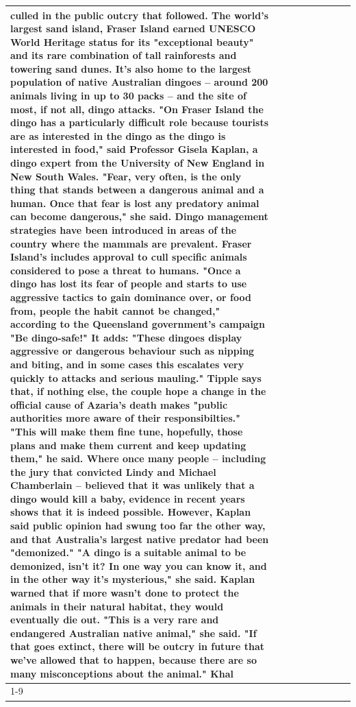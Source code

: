 \begin{table}[H]
\begin{tabular}{lllrlllll}
culled in the public outcry that followed. The world's largest sand island, Fraser Island earned UNESCO World Heritage status for its "exceptional beauty" and its rare combination of tall rainforests and towering sand dunes. It's also home to the largest population of native Australian dingoes -- around 200 animals living in up to 30 packs -- and the site of most, if not all, dingo attacks. "On Fraser Island the dingo has a particularly difficult role because tourists are as interested in the dingo as the dingo is interested in food," said Professor Gisela Kaplan, a dingo expert from the University of New England in New South Wales. "Fear, very often, is the only thing that stands between a dangerous animal and a human. Once that fear is lost any predatory animal can become dangerous," she said. Dingo management strategies have been introduced in areas of the country where the mammals are prevalent. Fraser Island's includes approval to cull specific animals considered to pose a threat to humans. "Once a dingo has lost its fear of people and starts to use aggressive tactics to gain dominance over, or food from, people the habit cannot be changed," according to the Queensland government's campaign "Be dingo-safe!" It adds: "These dingoes display aggressive or dangerous behaviour such as nipping and biting, and in some cases this escalates very quickly to attacks and serious mauling." Tipple says that, if nothing else, the couple hope a change in the official cause of Azaria's death makes "public authorities more aware of their responsibilties." "This will make them fine tune, hopefully, those plans and make them current and keep updating them," he said. Where once many people -- including the jury that convicted Lindy and Michael Chamberlain -- believed that it was unlikely that a dingo would kill a baby, evidence in recent years shows that it is indeed possible. However, Kaplan said public opinion had swung too far the other way, and that Australia's largest native predator had been "demonized." "A dingo is a suitable animal to be demonized, isn't it? In one way you can know it, and in the other way it's mysterious," she said. Kaplan warned that if more wasn't done to protect the animals in their natural habitat, they would eventually die out. "This is a very rare and endangered Australian native animal," she said. "If that goes extinct, there will be outcry in future that we've allowed that to happen, because there are so many misconceptions about the animal." Khal \\
\cline{1-9}

\end{tabular}
\end{table}
